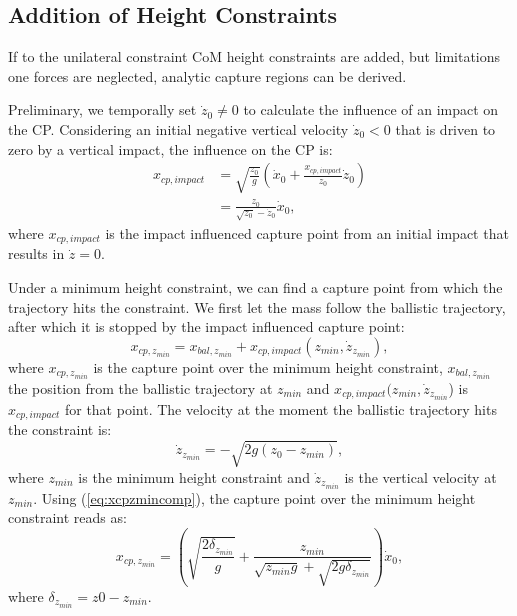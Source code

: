 \documentclass[letterpaper, 10 pt, conference]{ieeeconf}  %
\newcommand{\zmin}{z_{min}}
\begin{document}
\subsection{Addition of Height Constraints}
If to the unilateral constraint CoM height constraints are added, but limitations one forces are neglected, analytic capture regions can be derived. 

Preliminary, we temporally set $\dot{z}_0 \neq 0$ to calculate the influence of an impact on the CP. Considering an initial negative vertical velocity $\dot{z}_0<0$ that is driven to zero by a vertical impact, the influence on the CP is:
\begin{align}
	x_{cp,impact} &= \sqrt{\frac{z_0}{g}}(\dot{x}_0 + \frac{x_{cp,impact}}{z_0}\dot{z}_0)\\
	&=\frac{z_0}{\sqrt{z_0}-\dot{z}_0}\dot{x}_0,
\end{align}
where $x_{cp,impact}$ is the impact influenced capture point from an initial impact that results in $\dot{z}=0$.

Under a minimum height constraint, we can find a capture point from which the trajectory hits the constraint. We first let the mass follow the ballistic trajectory, after which it is stopped by the impact influenced capture point:
\begin{equation}
	x_{cp,\zmin} = x_{bal,\zmin} + x_{cp,impact}(\zmin, \dot{z}_{\zmin}),
	\label{eq:xcpzmincomp}
\end{equation}
where $x_{cp,\zmin}$ is the capture point over the minimum height constraint, $x_{bal,\zmin}$ the position from the ballistic trajectory at $\zmin$ and $x_{cp,impact}(\zmin,\dot{z}_{\zmin}$) is $x_{cp,impact}$ for that point.
The velocity at the moment the ballistic trajectory hits the constraint is:
\begin{equation}
	\dot{z}_{\zmin} = -\sqrt{2g(z_0-\zmin)},
\end{equation}
where $z_{min}$ is the minimum height constraint and $\dot{z}_{\zmin}$ is the vertical velocity at $z_{min}$. Using (\ref{eq:xcpzmincomp}), the capture point over the minimum height constraint reads as:
\begin{equation}
	x_{cp,\zmin} = (\sqrt{\frac{2\delta_{z_{min}}}{g}} + \frac{\zmin}{\sqrt{\zmin g}+\sqrt{2g\delta_{\zmin}}})\dot{x}_0,
\end{equation}
where $\delta_{\zmin}= z0-\zmin$.
\end{document}
